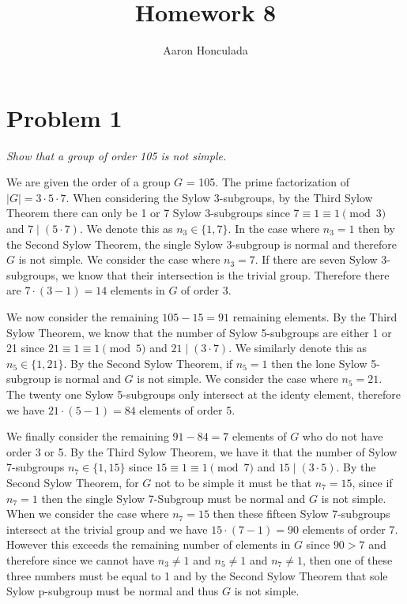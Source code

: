 \documentclass{article}
\title{Homework 8}
\author{Aaron Honculada}
\date{\monthname[\month] \the\year}
\theoremstyle{plain} %
\theoremstyle{definition} %
\begin{document}
\maketitle
\section*{Problem 1}
\noindent \textit{Show that a group of order 105 is not simple.}

We are given the order of a group $G$ = 105. The prime factorization of $|G| = 3 \cdot 5 \cdot 7$.
When considering the Sylow 3-subgroups, by the Third Sylow Theorem there can only be 1 or 7 Sylow 3-subgroups
since $7 \equiv 1 \equiv 1 \pmod{3}$ and $7 \mid (5 \cdot 7)$. We denote this as $n_3 \in \{1, 7\}$. In the case where
$n_3 = 1$ then by the Second Sylow Theorem, the single Sylow 3-subgroup is normal and therefore $G$ is not simple.
We consider the case where $n_3=7$. If there are seven Sylow 3-subgroups, we know that their intersection is the trivial
group. Therefore there are $7 \cdot (3-1) =14$ elements in $G$ of order 3. 

We now consider the remaining $105 - 15 = 91$ remaining elements. By the Third Sylow Theorem, we know that the number of 
Sylow 5-subgroups are either 1 or 21 since $21 \equiv 1 \equiv 1 \pmod{5}$ and $21 \mid (3 \cdot 7)$. We similarly
denote this as $n_5 \in \{1, 21\}$. By the Second Sylow Theorem, if $n_5 = 1$ then the lone Sylow 5-subgroup
is normal and $G$ is not simple. We consider the case where $n_5 = 21$. The twenty one Sylow 5-subgroups only
intersect at the identy element, therefore we have $21 \cdot (5-1) = 84$ elements of order 5.

We finally consider the remaining $91-84 = 7$ elements of $G$ who do not have order 3 or 5. By the Third
Sylow Theorem, we have it that the number of Sylow 7-subgroups $n_7 \in \{1, 15\}$ since 
$15 \equiv 1 \equiv 1 \pmod{7}$ and $15 \mid (3 \cdot 5)$. By the Second Sylow Theorem, for
$G$ not to be simple it must be that $n_7 = 15$, since if $n_7 = 1$ then the single Sylow 7-Subgroup must
be normal and $G$ is not simple. When we consider the case where $n_7 = 15$ then these
fifteen Sylow 7-subgroups intersect at the trivial group and we have $15 \cdot (7-1) = 90$ elements of order 7.
However this exceeds the remaining number of elements in $G$ since $90 > 7$ and therefore since we cannot have 
$n_3 \neq 1$ and $n_5 \neq 1$ and $n_7 \neq 1$, then one of these three numbers must be equal to 1 and by the Second
Sylow Theorem that sole Sylow p-subgroup must be normal and thus $G$ is not simple.
\end{document}
